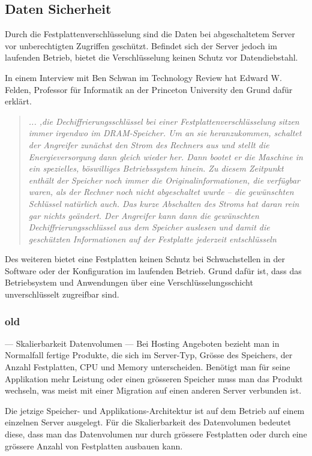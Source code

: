 \subsection{Daten Sicherheit}
Durch die Festplattenverschlüsselung sind die Daten bei abgeschaltetem Server vor unberechtigten Zugriffen geschützt. Befindet sich der Server jedoch im laufenden Betrieb, bietet die Verschlüsselung keinen Schutz vor Datendiebstahl. 

In einem Interview mit Ben Schwan im Technology Review hat Edward W. Felden, Professor für Informatik an der Princeton University den Grund dafür erklärt. 

\begin{quotation}\em
... ,die Dechiffrierungsschlüssel bei einer Festplattenverschlüsselung sitzen immer irgendwo im DRAM-Speicher. Um an sie heranzukommen, schaltet der Angreifer zunächst den Strom des Rechners aus und stellt die Energieversorgung dann gleich wieder her. Dann bootet er die Maschine in ein spezielles, böswilliges Betriebssystem hinein. Zu diesem Zeitpunkt enthält der Speicher noch immer die Originalinformationen, die verfügbar waren, als der Rechner noch nicht abgeschaltet wurde – die gewünschten Schlüssel natürlich auch. Das kurze Abschalten des Stroms hat daran rein gar nichts geändert. Der Angreifer kann dann die gewünschten Dechiffrierungsschlüssel aus dem Speicher auslesen und damit die geschützten Informationen auf der Festplatte jederzeit entschlüsseln\end{quotation}\cite{Schwan2008}

Des weiteren bietet eine Festplatten keinen Schutz bei Schwachstellen in der Software oder  der Konfiguration im laufenden Betrieb. Grund dafür ist, dass das Betriebsystem und Anwendungen über eine Verschlüsselungsschicht unverschlüsselt zugreifbar sind.

\subsubsection{old}
--- Skalierbarkeit Datenvolumen ---
Bei Hosting Angeboten bezieht man in Normalfall fertige Produkte, die sich im Server-Typ, Grösse des Speichers, der Anzahl Festplatten, CPU und Memory unterscheiden. Benötigt man für seine Applikation mehr Leistung oder einen grösseren Speicher muss man das Produkt wechseln, was meist mit einer Migration auf einen anderen Server verbunden ist.

Die jetzige Speicher- und Applikations-Architektur ist auf dem Betrieb auf einem einzelnen Server ausgelegt. Für die Skalierbarkeit des Datenvolumen bedeutet diese, dass man das Datenvolumen nur durch grössere Festplatten oder durch eine grössere Anzahl von Festplatten ausbauen kann. 

